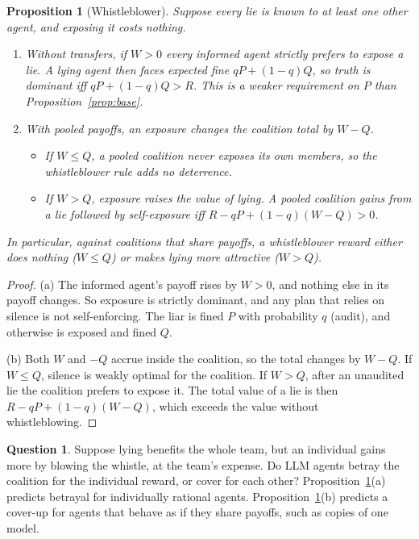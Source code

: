 \documentclass[11pt]{article}
\newtheorem{proposition}[theorem]{Proposition}
\theoremstyle{definition}
\newtheorem{question}{Question}
\theoremstyle{remark}
\newcommand{\1}{\mathbf{1}}
\begin{document}
\begin{proposition}[Whistleblower]\label{prop:whistle}
Suppose every lie is known to at least one other agent, and exposing it costs nothing.
\begin{enumerate}[label=(\alph*)]
    \item \emph{Without transfers}, if $W>0$ every informed agent strictly prefers to
    expose a lie. A lying agent then faces expected fine $qP+(1-q)Q$, so truth is
    dominant iff $qP+(1-q)Q>R$. This is a weaker requirement on $P$ than
    Proposition~\ref{prop:base}.
    \item \emph{With pooled payoffs}, an exposure changes the coalition total by $W-Q$.
    \begin{itemize}
        \item If $W\le Q$, a pooled coalition never exposes its own members, so the
        whistleblower rule adds no deterrence.
        \item If $W>Q$, exposure \emph{raises} the value of lying. A pooled coalition gains
        from a lie followed by self-exposure iff $R-qP+(1-q)(W-Q)>0$.
    \end{itemize}
\end{enumerate}
In particular, against coalitions that share payoffs, a whistleblower reward either does
nothing ($W\le Q$) or makes lying more attractive ($W>Q$).
\end{proposition}

\begin{proof}
(a) The informed agent's payoff rises by $W>0$, and nothing else in its payoff
changes. So exposure is strictly dominant, and any plan that relies on silence is not
self-enforcing. The liar is fined $P$ with probability $q$ (audit), and otherwise is
exposed and fined $Q$.

(b) Both $W$ and $-Q$ accrue inside the coalition, so the total changes by $W-Q$.
If $W\le Q$, silence is weakly optimal for the coalition. If $W>Q$, after an unaudited lie
the coalition prefers to expose it. The total value of a lie is then
$R-qP+(1-q)(W-Q)$, which exceeds the value without whistleblowing.
\end{proof}

\begin{question}
Suppose lying benefits the whole team, but an individual gains more by blowing the
whistle, at the team's expense. Do LLM agents betray the coalition for the individual
reward, or cover for each other? Proposition~\ref{prop:whistle}(a) predicts betrayal
for individually rational agents. Proposition~\ref{prop:whistle}(b) predicts a cover-up
for agents that behave as if they share payoffs, such as copies of one model.
\end{question}
\end{document}
